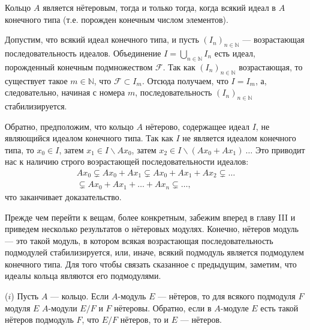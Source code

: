 \begin{determ}
\textit{\indent} Кольцо $A$ является нётеровым, тогда и только тогда, когда всякий идеал в $A$ конечного типа (т.е. порожден конечным числом элементов).
\end{determ}

\begin{myproof}
Допустим, что всякий идеал конечного типа, и пусть $(I_n)_{n \in \mathds{N}}$ — возрастающая последовательность идеалов. Объединение $I = \bigcup_{n \in \mathds{N}} I_n$ есть идеал, порожденный конечным подмножеством $\mathcal{F}$. Так как $(I_n)_{n \in \mathds{N}}$ возрастающая, то существует такое $m \in \mathds{N}$, что $\mathcal{F} \subset I_m$. Отсюда получаем, что $I = I_m$, а, следовательно, начиная с номера $m$, последовательность $(I_n)_{n \in \mathds{N}}$ стабилизируется.

\newpage
\noindent Обратно, предположим, что кольцо $A$ нётерово, содержащее идеал $I$, не являющийся идеалом конечного типа. Так как $I$ не является идеалом конечного типа, то $x_0 \in I$, затем $x_1 \in I \backslash A x_0$, затем $x_2 \in I \backslash (A x_0 + A x_1 )\:\dots$ Это приводит нас к наличию строго воэрастающей последовательности идеалов:
\begin{align*}
Ax_0 \varsubsetneq Ax_0 + Ax_1 \varsubsetneq Ax_0 + Ax_1 + Ax_2 \varsubsetneq \dots \\
\varsubsetneq Ax_0 + Ax_1 + \dots + Ax_n \varsubsetneq \dots\text{,}
\end{align*}
что заканчивает доказательство.
\end{myproof}
Прежде чем перейти к вещам, более конкретным, забежим вперед в главу III и приведем несколько результатов о нётеровых модулях. Конечно, нётеров модуль — это такой модуль, в котором всякая возрастающая последовательность подмодулей стабилизируется, или, иначе, всякий подмодуль является подмодулем конечного типа. Для того чтобы связать сказанное с предыдущим, заметим, что идеалы кольца являются его подмодулями.

\begin{predl}
\textit{\indent} ($i$) Пусть $A$ — кольцо. Если $A$-модуль $E$ — нётеров, то для всякого подмодуля $F$ модуля $E$ $A$-модули $E/F$ и $F$ нётеровы. Обратно, если в $A$-модуле $E$ есть такой нётеров подмодуль $F$, что $E/F$ нётеров, то и $E$ — нётеров.
\end{predl}

